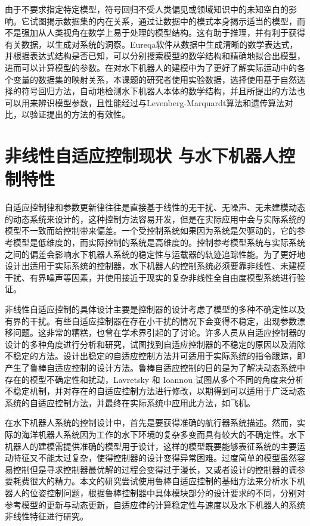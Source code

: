 由于不要求指定特定模型，符号回归不受人类偏见或领域知识中的未知空白的影响。它试图揭示数据集的内在关系，通过让数据中的模式本身揭示适当的模型，而不是强加从人类视角在数学上易于处理的模型结构。这有助于推理，并有利于获得有关数据，以生成对系统的洞察。Eureqa软件从数据中生成清晰的数学表达式，并根据表达式结构是否已知，可以分别搜索模型的数学结构和精确地拟合出模型，进而可以计算模型的参数\cite{stoutemyer2013can}。在对水下机器人的建模中为了更好了解实际运动中的各个变量的数据集的映射关系，本课题的研究者使用实验数据，选择使用基于自然选择的符号回归方法，自动地检测水下机器人本体的数学结构，并且所提出的方法也可以用来辨识模型参数，且性能经过与Levenberg-Marquardt算法和遗传算法对比，以验证提出的方法的有效性\cite{wu2016parametric,Moreno2015Symbolic}。


\section{非线性自适应控制现状 与水下机器人控制特性 }

自适应控制律和参数更新律往往是直接基于线性的无干扰、无噪声、无未建模动态的动态系统来设计的，这种控制方法容易开发，但是在实际应用中会与实际系统的模型不一致而给控制带来偏差。一个受控制系统如果因为系统是欠驱动的，它的参考模型是低维度的，而实际控制的系统是高维度的\cite{russdrakebook}。控制参考模型系统与实际系统之间的偏差会影响水下机器人系统的稳定性与运载器的轨迹追踪性能\cite{li2005design,jun2009development,garcia2014modelling,wang2016fast}。为了更好地设计出适用于实际系统的控制器，水下机器人的控制系统必须要靠非线性、未建模干扰、有界噪声等因素，并使用接近于现实的复杂非线性全自由度模型系统进行验证。

非线性自适应控制的具体设计主要是控制器的设计考虑了模型的多种不确定性以及有界的干扰。有些自适应控制器在存在小干扰的情况下会变得不稳定，出现参数漂移问题。这非常的糟糕，也曾在学术界引起的了讨论。许多人员从自适应控制器的设计的多种角度进行分析和研究，试图找到自适应控制器的不稳定的原因以及消除不稳定的方法。设计出稳定的自适应控制方法并可适用于实际系统的指令跟踪，即产生了鲁棒自适应控制的设计方法。鲁棒自适应控制的目的是为了解决动态系统中存在的模型不确定性和扰动，Lavretsky 和 Ioannou 试图从多个不同的角度来分析不稳定机制，并对存在的自适应控制方法进行修改，以期得到可以适用于广泛动态系统的自适应控制方法，并最终在实际系统中应用此方法，如飞机\cite{lavretsky2013robust,Ioannou2012}。

在水下机器人系统的控制设计中，首先是要获得准确的航行器系统描述。然而，实际的海洋机器人系统因为工作的水下环境的复杂多变而具有较大的不确定性。水下机器人的建模需提供准确的模型用于设计，这样的模型既要能够表征系统的主要运动特征又不能太过复杂，使得控制器的设计变得异常困难\cite{fossen1991nonlinear,beinset2007controller,eriksen2015horizontal}。过度简单的模型虽然容易控制但是寻求控制器最优解的过程会变得过于漫长，又或者设计的控制器的调参要耗费很大的精力\cite{sutton1998reinforcement,madady2008pid}。本文的研究尝试使用鲁棒自适应控制的基础方法来分析水下机器人的位姿控制问题，根据鲁棒控制器中具体模块部分的设计要求的不同，分别对参考模型的更新与动态更新，自适应律的计算稳定性与速度以及水下机器人的系统非线性特征进行研究。



